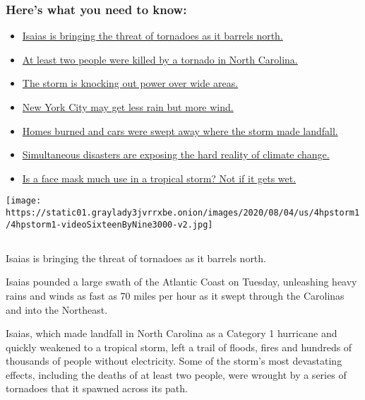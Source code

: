 \hypertarget{heres-what-you-need-to-know}{%
\subsubsection{Here's what you need to
know:}\label{heres-what-you-need-to-know}}

\begin{itemize}
\tightlist
\item
  \protect\hyperlink{link-362830dd}{Isaias is bringing the threat of
  tornadoes as it barrels north.}
\item
  \protect\hyperlink{link-7961bdbc}{At least two people were killed by a
  tornado in North Carolina.}
\item
  \protect\hyperlink{link-34e5d4e4}{The storm is knocking out power over
  wide areas.}
\item
  \protect\hyperlink{link-29c12cc}{New York City may get less rain but
  more wind.}
\item
  \protect\hyperlink{link-5066ef1c}{Homes burned and cars were swept
  away where the storm made landfall.}
\item
  \protect\hyperlink{link-665175e7}{Simultaneous disasters are exposing
  the hard reality of climate change.}
\item
  \protect\hyperlink{link-e77dd06}{Is a face mask much use in a tropical
  storm? Not if it gets wet.}
\end{itemize}

\texttt{[image: https://static01.graylady3jvrrxbe.onion/images/2020/08/04/us/4hpstorm1/4hpstorm1-videoSixteenByNine3000-v2.jpg]}

\subsection{}

Isaias is bringing the threat of tornadoes as it barrels north.

Isaias pounded a large swath of the Atlantic Coast on Tuesday,
unleashing heavy rains and winds as fast as 70 miles per hour as it
swept through the Carolinas and into the Northeast.

Isaias, which made landfall in North Carolina as a Category 1 hurricane
and quickly weakened to a tropical storm, left a trail of floods, fires
and hundreds of thousands of people without electricity. Some of the
storm's most devastating effects, including the deaths of at least two
people, were wrought by a series of tornadoes that it spawned across its
path.

